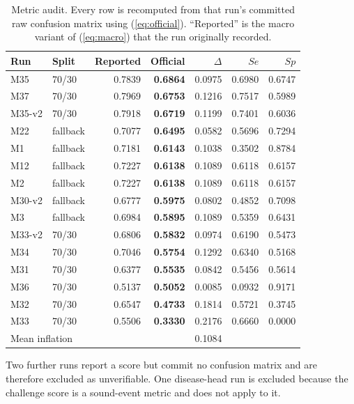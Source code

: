 \documentclass[journal,onecolumn]{IEEEtran}
\newcommand{\best}[1]{\textbf{#1}}
\begin{document}
\begin{table}[!t]
\centering
\caption{Metric audit. Every row is recomputed from that run's committed raw
confusion matrix using (\ref{eq:official}). ``Reported'' is the macro variant of
(\ref{eq:macro}) that the run originally recorded.}
\label{tab:metricaudit}
\begin{tabular}{llrrrrr}
\toprule
Run & Split & Reported & \best{Official} & $\Delta$ & $Se$ & $Sp$ \\
\midrule
M35    & 70/30    & 0.7839 & \best{0.6864} & 0.0975 & 0.6980 & 0.6747 \\
M37    & 70/30    & 0.7969 & \best{0.6753} & 0.1216 & 0.7517 & 0.5989 \\
M35-v2 & 70/30    & 0.7918 & \best{0.6719} & 0.1199 & 0.7401 & 0.6036 \\
M22    & fallback & 0.7077 & \best{0.6495} & 0.0582 & 0.5696 & 0.7294 \\
M1     & fallback & 0.7181 & \best{0.6143} & 0.1038 & 0.3502 & 0.8784 \\
M12    & fallback & 0.7227 & \best{0.6138} & 0.1089 & 0.6118 & 0.6157 \\
M2     & fallback & 0.7227 & \best{0.6138} & 0.1089 & 0.6118 & 0.6157 \\
M30-v2 & fallback & 0.6777 & \best{0.5975} & 0.0802 & 0.4852 & 0.7098 \\
M3     & fallback & 0.6984 & \best{0.5895} & 0.1089 & 0.5359 & 0.6431 \\
M33-v2 & 70/30    & 0.6806 & \best{0.5832} & 0.0974 & 0.6190 & 0.5473 \\
M34    & 70/30    & 0.7046 & \best{0.5754} & 0.1292 & 0.6340 & 0.5168 \\
M31    & 70/30    & 0.6377 & \best{0.5535} & 0.0842 & 0.5456 & 0.5614 \\
M36    & 70/30    & 0.5137 & \best{0.5052} & 0.0085 & 0.0932 & 0.9171 \\
M32    & 70/30    & 0.6547 & \best{0.4733} & 0.1814 & 0.5721 & 0.3745 \\
M33    & 70/30    & 0.5506 & \best{0.3330} & 0.2176 & 0.6660 & 0.0000 \\
\midrule
\multicolumn{4}{l}{Mean inflation} & 0.1084 & & \\
\bottomrule
\end{tabular}

\vspace{2pt}
\footnotesize Two further runs report a score but commit no confusion matrix and are
therefore excluded as unverifiable. One disease-head run is excluded because the
challenge score is a sound-event metric and does not apply to it.
\end{table}
\end{document}
